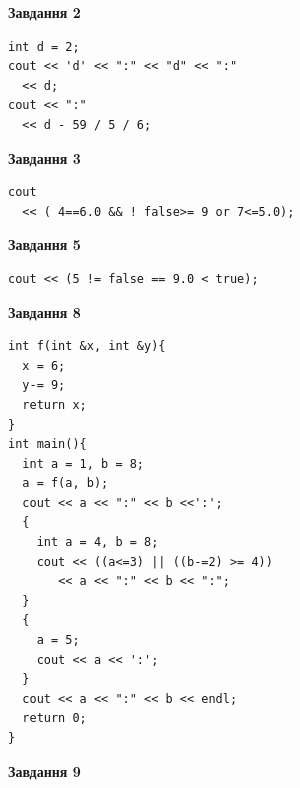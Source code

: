 \documentclass[12pt, ukrainian]{article}
\begin{document}
{\begin {large}
\begin{minipage}[t]{7.0cm}
\end{minipage}
\vline \hspace{1mm}
\begin{minipage}[t]{11.0cm}

\begin{center}
\textbf{Завдання 2}
\end{center}
\vspace{-8mm}

\begin{verbatim}
int d = 2;
cout << 'd' << ":" << "d" << ":" 
  << d;
cout << ":" 
  << d - 59 / 5 / 6;
\end{verbatim}



\begin{center}
\textbf{Завдання 3}
\end{center}
\vspace{-8mm}

\begin{verbatim}
cout 
  << ( 4==6.0 && ! false>= 9 or 7<=5.0);
\end{verbatim}



\begin{center}
\textbf{Завдання 5}
\end{center}
\vspace{-8mm}

\begin{verbatim}
cout << (5 != false == 9.0 < true);
\end{verbatim}



\begin{center}
\textbf{Завдання 8}
\end{center}
\vspace{-8mm}

\begin{verbatim}
int f(int &x, int &y){
  x = 6;
  y-= 9;
  return x;
}
int main(){
  int a = 1, b = 8;
  a = f(a, b);
  cout << a << ":" << b <<':';
  {
    int a = 4, b = 8;
    cout << ((a<=3) || ((b-=2) >= 4))
       << a << ":" << b << ":";
  }
  {
    a = 5;
    cout << a << ':';
  }
  cout << a << ":" << b << endl;
  return 0;
}
\end{verbatim}

\end{minipage}


\begin{minipage}[t]{7.0cm}

\begin{center}
\textbf{Завдання 9}
\end{center}
\vspace{-8mm}


\end{minipage}
\end{large}}
\end{document}
